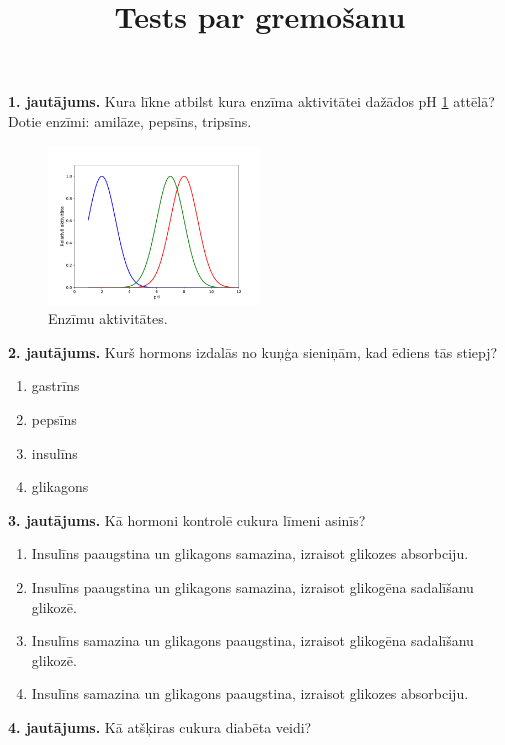 \documentclass[12pt,a4paper]{article}
\title{\textbf{Tests par gremošanu}}
\author{}
\date{}
\begin{document}
\maketitle


\noindent \textbf{1. jautājums.} Kura līkne atbilst kura enzīma aktivitātei dažādos pH \ref{fig:liknes} attēlā? Dotie enzīmi: amilāze, pepsīns, tripsīns.

\begin{figure}[H]
    \centering
    \includegraphics[width=0.5\textwidth]{atteli/enzimi_pH.png}
    \caption{Enzīmu aktivitātes.}
    \label{fig:liknes}
\end{figure}

\noindent \textbf{2. jautājums.} Kurš hormons izdalās no kuņģa sieniņām, kad ēdiens tās stiepj? 

\begin{enumerate}[label=\Alph*.]
    \item gastrīns
    \item pepsīns
    \item insulīns
    \item glikagons
\end{enumerate}

\noindent \textbf{3. jautājums.} Kā hormoni kontrolē cukura līmeni asinīs? 

\begin{enumerate}[label=\Alph*.]
    \item Insulīns paaugstina un glikagons samazina, izraisot glikozes absorbciju.
    \item Insulīns paaugstina un glikagons samazina, izraisot glikogēna sadalīšanu glikozē.
    \item Insulīns samazina un glikagons paaugstina, izraisot glikogēna sadalīšanu glikozē.
    \item Insulīns samazina un glikagons paaugstina, izraisot glikozes absorbciju.
\end{enumerate}

\noindent \textbf{4. jautājums.} Kā atšķiras cukura diabēta veidi?
\end{document}
